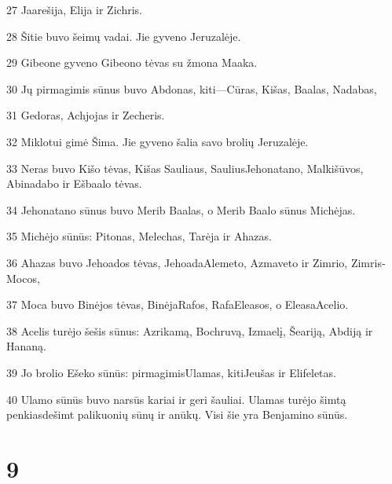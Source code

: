 \par 27 Jaarešija, Elija ir Zichris. 
\par 28 Šitie buvo šeimų vadai. Jie gyveno Jeruzalėje. 
\par 29 Gibeone gyveno Gibeono tėvas su žmona Maaka. 
\par 30 Jų pirmagimis sūnus buvo Abdonas, kiti—Cūras, Kišas, Baalas, Nadabas, 
\par 31 Gedoras, Achjojas ir Zecheris. 
\par 32 Miklotui gimė Šima. Jie gyveno šalia savo brolių Jeruzalėje. 
\par 33 Neras buvo Kišo tėvas, Kišas­ Sauliaus, Saulius­Jehonatano, Malkišūvos, Abinadabo ir Ešbaalo tėvas. 
\par 34 Jehonatano sūnus buvo Merib Baalas, o Merib Baalo sūnus­ Michėjas. 
\par 35 Michėjo sūnūs: Pitonas, Melechas, Tarėja ir Ahazas. 
\par 36 Ahazas buvo Jehoados tėvas, Jehoada­Alemeto, Azmaveto ir Zimrio, Zimris­Mocos, 
\par 37 Moca buvo Binėjos tėvas, Binėja­Rafos, Rafa­Eleasos, o Eleasa­Acelio. 
\par 38 Acelis turėjo šešis sūnus: Azrikamą, Bochruvą, Izmaelį, Šeariją, Abdiją ir Hananą. 
\par 39 Jo brolio Ešeko sūnūs: pirmagimis­Ulamas, kiti­Jeušas ir Elifeletas. 
\par 40 Ulamo sūnūs buvo narsūs kariai ir geri šauliai. Ulamas turėjo šimtą penkiasdešimt palikuonių­ sūnų ir anūkų. Visi šie yra Benjamino sūnūs.



\chapter{9}

